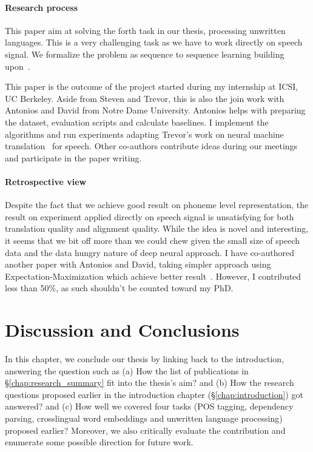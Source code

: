 \documentclass[12pt,twoside,final,hidelinks]{ltthesis}
\theoremstyle{definition}
\begin{document}
\subsubsection{Research process}
This paper aim at solving the forth task in our thesis, processing unwritten languages. This is a very challenging task as we have to work directly on speech 
signal. We formalize the problem as sequence to sequence learning building upon~. 

This paper is the outcome of the project started during my internship at ICSI, UC Berkeley. Aside from Steven and Trevor, this is also the join work with Antonios and David from Notre Dame University. Antonios helps with preparing the dataset, evaluation scripts and calculate baselines. I implement the algorithms and run experiments adapting Trevor's work on neural machine translation~\cite{cohn-EtAl:2016:N16-1} for speech. Other co-authors contribute ideas during our meetings and participate in the paper writing. 

\subsubsection{Retrospective view}
Despite the fact that we achieve good result on phoneme level representation, the result on experiment applied directly on speech signal is unsatisfying for both 
translation quality and alignment quality. While the idea is novel and interesting, it seems that we bit off more than we could chew given the small size of speech 
data and the data hungry nature of deep neural approach. I have co-authored another paper with Antonios and David, taking simpler approach using Expectation-Maximization which achieve better result~\cite{anastasopoulos-chiang-duong:2016:EMNLP2016}. However, I contributed less than 50\%, as such shouldn't be counted toward my PhD.




\chapter{Discussion and Conclusions}
\label{chap:conclusion}
In this chapter, we conclude our thesis by linking back to the introduction, answering the question such as (a) How the list of publications in \S\ref{chap:research_summary} fit into the thesis's aim? and (b) How the research questions proposed earlier in the introduction chapter (\S\ref{chap:introduction}) got 
answered? and (c) How well we covered four tasks (POS tagging, dependency parsing, crosslingual word embeddings and unwritten language processing) proposed earlier? Moreover, we also critically evaluate the contribution and enumerate some possible direction
for future work. 
\end{document}

